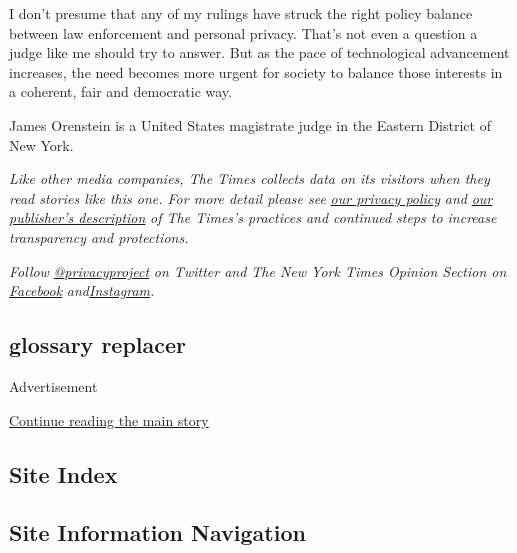 I don't presume that any of my rulings have struck the right policy
balance between law enforcement and personal privacy. That's not even a
question a judge like me should try to answer. But as the pace of
technological advancement increases, the need becomes more urgent for
society to balance those interests in a coherent, fair and democratic
way.

James Orenstein is a United States magistrate judge in the Eastern
District of New York.

\emph{Like other media companies, The Times collects data on its
visitors when they read stories like this one. For more detail please
see}
\href{https://help.nytimes.com/hc/en-us/articles/115014892108-Privacy-policy?module=inline}{\emph{our
privacy policy}} \emph{and}
\href{https://www.nytimes.com/2019/04/10/opinion/sulzberger-new-york-times-privacy.html?rref=collection\%2Fspotlightcollection\%2Fprivacy-project-does-privacy-matter\&action=click\&contentCollection=opinion\&region=stream\&module=stream_unit\&version=latest\&contentPlacement=8\&pgtype=collection}{\emph{our
publisher's description}} \emph{of The Times's practices and continued
steps to increase transparency and protections.}

\emph{Follow}
\href{https://twitter.com/privacyproject}{\emph{@privacyproject}}
\emph{on Twitter and The New York Times Opinion Section on}
\href{https://www.facebook.com/nytopinion}{\emph{Facebook}}
\emph{and}\href{https://www.instagram.com/nytopinion/}{\emph{Instagram}}\emph{.}

\hypertarget{glossary-replacer}{%
\subsection{glossary replacer}\label{glossary-replacer}}

Advertisement

\protect\hyperlink{after-bottom}{Continue reading the main story}

\hypertarget{site-index}{%
\subsection{Site Index}\label{site-index}}

\hypertarget{site-information-navigation}{%
\subsection{Site Information
Navigation}\label{site-information-navigation}}

